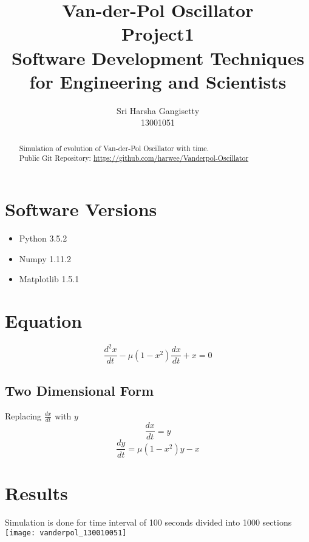 \documentclass[a4paper]{article}
\title{Van-der-Pol Oscillator\\
			\large Project1 \\
			\large Software Development Techniques for Engineering and Scientists}
\author{Sri Harsha Gangisetty \\
					13001051}
\begin{document}
\maketitle






\begin{abstract}
Simulation of evolution of Van-der-Pol Oscillator with time. \\

Public Git Repository: \href{https://github.com/harwee/Vanderpol-Oscillator}{https://github.com/harwee/Vanderpol-Oscillator}

\end{abstract}

\section{Software Versions}

\begin{itemize}
\item Python 3.5.2
\item Numpy 1.11.2
\item Matplotlib 1.5.1
\end{itemize}
\section{Equation}

\begin{equation}
\frac{d^2x}{dt}-\mu (1-x^2) \frac{dx}{dt} + x = 0
\end{equation}
\subsection{Two Dimensional Form}

	Replacing $ \frac{dx}{dt} $ with $ y $ \\
	\begin{equation}
	\frac{dx}{dt} = y
	\end{equation}
    \begin{equation}
	\frac{dy}{dt} = \mu (1-x^2)y -x
	\end{equation}
\newpage
\section{Results}
	Simulation is done for time interval of 100 seconds divided into 1000 sections
\centering
\texttt{[image: vanderpol\_130010051]}
\end{document}
